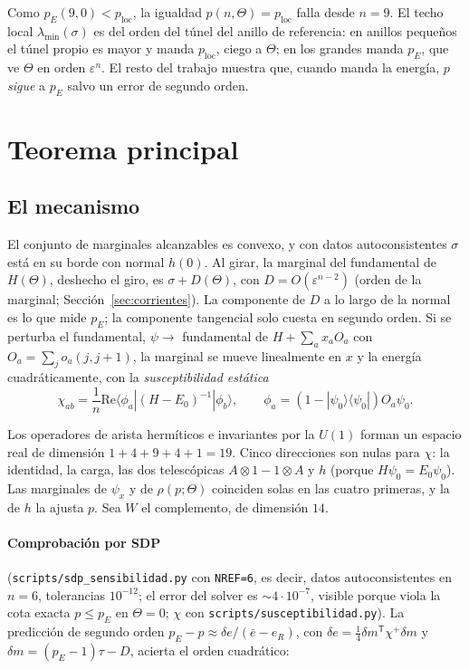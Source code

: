 \documentclass[11pt,a4paper]{article}
\theoremstyle{definition}
\theoremstyle{remark}
\newcommand{\ket}[1]{|#1\rangle}
\newcommand{\bra}[1]{\langle #1|}
\newcommand{\eps}{\varepsilon}
\newcommand{\pE}{p_{E}}
\newcommand{\ploc}{p_{\mathrm{loc}}}
\newcommand{\scr}[1]{\texttt{scripts/#1}}
\begin{document}
\noindent
Como $\pE(9,0)<\ploc$, la igualdad $p(n,\Theta)=\ploc$ falla desde $n=9$. El techo local
$\lambda_{\min}(\sigma)$ es del orden del túnel del anillo de referencia: en anillos pequeños el túnel
propio es mayor y manda $\ploc$, ciego a $\Theta$; en los grandes manda $\pE$, que ve $\Theta$ en orden
$\eps^n$. El resto del trabajo muestra que, cuando manda la energía, $p$ \emph{sigue} a $\pE$ salvo un
error de segundo orden.

\section{Teorema principal}\label{sec:principal}

\subsection{El mecanismo}

El conjunto de marginales alcanzables es convexo, y con datos autoconsistentes $\sigma$ está en su
borde con normal $h(0)$. Al girar, la marginal del fundamental de $H(\Theta)$, deshecho el giro, es
$\sigma+D(\Theta)$, con $D=O(\eps^{n-2})$ (orden de la marginal; Sección~\ref{sec:corrientes}). La
componente de $D$ a lo largo de la normal es lo que mide $\pE$; la componente tangencial solo cuesta en
segundo orden. Si se perturba el fundamental, $\psi\to$ fundamental de $H+\sum_ax_aO_a$ con
$O_a=\sum_jo_a(j,j+1)$, la marginal se mueve linealmente en $x$ y la energía cuadráticamente, con la
\emph{susceptibilidad estática}
\begin{equation}\label{eq:chi}
  \chi_{ab}=\frac1n\mathrm{Re}\bra{\phi_a}(H-E_0)^{-1}\ket{\phi_b},\qquad
  \phi_a=(1-\ket{\psi_0}\bra{\psi_0})O_a\psi_0 .
\end{equation}

Los operadores de arista hermíticos e invariantes por la $U(1)$ forman un espacio real de dimensión
$1+4+9+4+1=19$. Cinco direcciones son nulas para $\chi$: la identidad, la carga, las dos telescópicas
$A\otimes1-1\otimes A$ y $h$ (porque $H\psi_0=E_0\psi_0$). Las marginales de $\psi_x$ y de
$\rho(p;\Theta)$ coinciden solas en las cuatro primeras, y la de $h$ la ajusta $p$. Sea $W$ el
complemento, de dimensión $14$.

\paragraph{Comprobación por SDP} (\scr{sdp\_sensibilidad.py} con \texttt{NREF=6}, es decir, datos
autoconsistentes en $n=6$, tolerancias $10^{-12}$; el error del solver es $\sim4\cdot10^{-7}$, visible porque
viola la cota exacta $p\le\pE$ en $\Theta=0$; $\chi$ con \scr{susceptibilidad.py}). La
predicción de segundo orden $\pE-p\approx\delta e/(\bar e-e_R)$, con
$\delta e=\frac14\delta m^{\mathsf T}\chi^+\delta m$ y $\delta m=(\pE-1)\tau-D$, acierta el orden
cuadrático:
\end{document}
